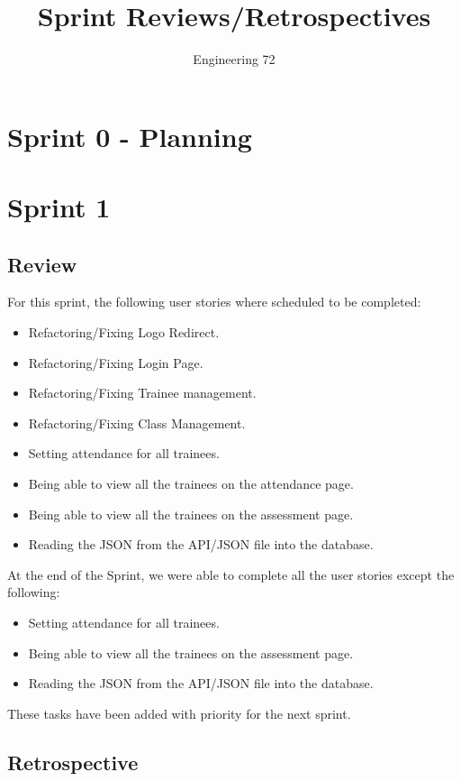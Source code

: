 \documentclass[]{report}
\title{Sprint Reviews/Retrospectives}
\author{Engineering 72}
\begin{document}
	\maketitle
	
	\tableofcontents
	
	\chapter*{Sprint 0 - Planning}
	\chapter*{Sprint 1}
		\section*{Review}
			For this sprint, the following user stories where scheduled to be completed:
			\begin{itemize}
				\item Refactoring/Fixing Logo Redirect.
				\item Refactoring/Fixing Login Page.
				\item Refactoring/Fixing Trainee management.
				\item Refactoring/Fixing Class Management.
				\item Setting attendance for all trainees.
				\item Being able to view all the trainees on the attendance page.
				\item Being able to view all the trainees on the assessment page.
				\item Reading the JSON from the API/JSON file into the database.
			\end{itemize}
			At the end of the Sprint, we were able to complete all the user stories except the following:
			\begin{itemize}
				\item Setting attendance for all trainees.
				\item Being able to view all the trainees on the assessment page.
				\item Reading the JSON from the API/JSON file into the database.
			\end{itemize}
			These tasks have been added with priority for the next sprint.
		\section*{Retrospective}
\end{document}
